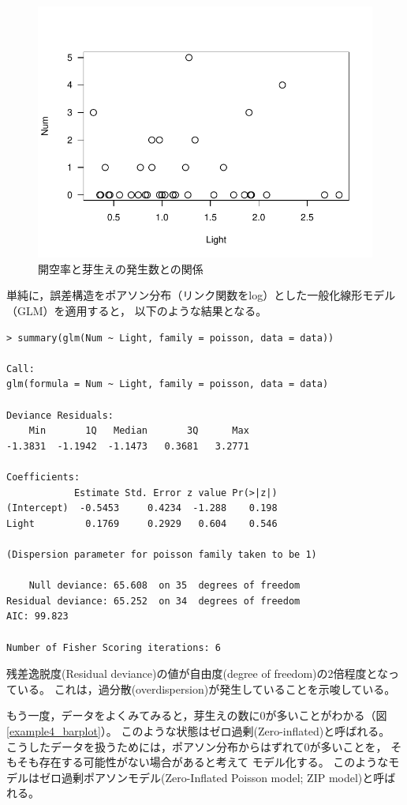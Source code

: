 \documentclass[11pt,uplatex]{jsarticle}
\begin{document}
\begin{figure}[hbtp]
  \begin{center}
    \includegraphics[bb=0 0 360 270, clip, width=300 bp]{example4_scatter.pdf}
  \end{center}
  \caption{開空率と芽生えの発生数との関係}
  \label{example4_scatter}
\end{figure}

単純に，誤差構造をポアソン分布（リンク関数をlog）とした一般化線形モデル（GLM）を適用すると，
以下のような結果となる。

\begin{lstlisting}
> summary(glm(Num ~ Light, family = poisson, data = data))

Call:
glm(formula = Num ~ Light, family = poisson, data = data)

Deviance Residuals: 
    Min       1Q   Median       3Q      Max  
-1.3831  -1.1942  -1.1473   0.3681   3.2771  

Coefficients:
            Estimate Std. Error z value Pr(>|z|)
(Intercept)  -0.5453     0.4234  -1.288    0.198
Light         0.1769     0.2929   0.604    0.546

(Dispersion parameter for poisson family taken to be 1)

    Null deviance: 65.608  on 35  degrees of freedom
Residual deviance: 65.252  on 34  degrees of freedom
AIC: 99.823

Number of Fisher Scoring iterations: 6
\end{lstlisting}

残差逸脱度(Residual deviance)の値が自由度(degree of freedom)の2倍程度となっている。
これは，過分散(overdispersion)が発生していることを示唆している。

もう一度，データをよくみてみると，芽生えの数に0が多いことがわかる（図\ref{example4_barplot}）。
このような状態はゼロ過剰(Zero-inflated)と呼ばれる。
こうしたデータを扱うためには，ポアソン分布からはずれて0が多いことを，
そもそも存在する可能性がない場合があると考えて
モデル化する。
このようなモデルはゼロ過剰ポアソンモデル(Zero-Inflated Poisson model; ZIP model)と呼ばれる。
\end{document}
